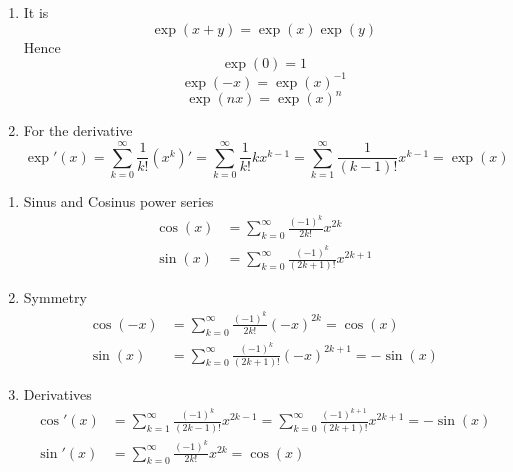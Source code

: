 \begin{lemma}\hfill
    \begin{enumerate}
        \item It is
              \[
                  \exp(x + y) = \exp(x)\exp(y)
              \]
              Hence
              \[
                  \exp(0) = 1
              \]
              \[
                  \exp(-x) = {\exp(x)}^{-1}
              \]
              \[
                  \exp(nx) = {\exp(x)}^n
              \]
        \item For the derivative
              \[
                  \exp'(x) = \sum_{k=0}^\infty \frac{1}{k!} (x^k)' = \sum_{k=0}^\infty \frac{1}{k!} kx^{k-1}
                  = \sum_{k=1}^\infty \frac{1}{(k-1)!} x^{k-1} = \exp(x)
              \]
    \end{enumerate}
\end{lemma}
\bigskip


\begin{lemma}\hfill
    \begin{enumerate}
        \item Sinus and Cosinus power series
              \[
                  \begin{split}
                      \cos(x) &= \sum_{k=0}^\infty \frac{{(-1)}^k}{2k!} x^{2k} \\
                      \sin(x) &= \sum_{k=0}^\infty \frac{{(-1)}^k}{(2k + 1)!} x^{2k + 1}
                  \end{split}
              \]
        \item Symmetry
              \[
                  \begin{split}
                      \cos(-x) &= \sum_{k=0}^\infty \frac{{(-1)}^k}{2k!} {(-x)}^{2k} = \cos(x) \\
                      \sin(x) &= \sum_{k=0}^\infty \frac{{(-1)}^k}{(2k + 1)!} {(-x)}^{2k + 1} = -\sin(x)
                  \end{split}
              \]
        \item Derivatives
              \[
                  \begin{split}
                      \cos'(x) &= \sum_{k=1}^\infty \frac{{(-1)}^k}{(2k - 1)!} x^{2k - 1}
                      = \sum_{k=0}^\infty \frac{{(-1)}^{k + 1}}{(2k + 1)!} x^{2k + 1} = -\sin(x) \\
                      \sin'(x) &= \sum_{k=0}^\infty \frac{{(-1)}^k}{2k!} {x}^{2k} = \cos(x)
                  \end{split}
              \]
    \end{enumerate}
\end{lemma}
\bigskip



